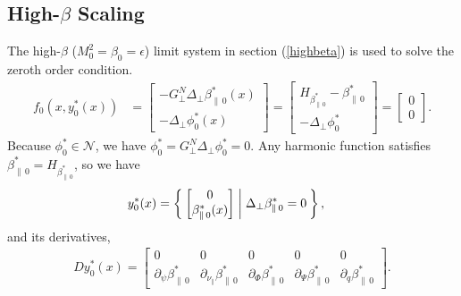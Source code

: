 \documentclass{article}
\newcommand{\para}{\parallel}
\newcommand{\ep}{\epsilon}
\newcommand{\lap}{\Delta_\perp}
\newcommand{\p}{\partial}
\newcommand{\GN}{G_\perp^N}
\newcommand{\bmat} [1] {\begin{bmatrix} #1 \end{bmatrix}}
\begin{document}
\subsection{High-$\beta$ Scaling}
The high-$\beta$ ($M_0^2 = \beta_0 = \ep$) limit system in section (\ref{highbeta}) is used to solve the zeroth order condition. 
\begin{align*}
    f_0(x,y_0^*(x)) &= \bmat{-\GN\lap\beta_{\para\,0}^*(x) \\ -\lap\phi_0^*(x)} = \bmat{H_{\beta_{\para\,0}^*} - \beta_{\para\,0}^* \\ -\lap\phi_0^*} = \bmat{0\\0}.   
\end{align*} 
Because $\phi_0^*\in\mathcal{N}$, we have $\phi_0^* = \GN\lap\phi_0^* = 0$. Any harmonic function satisfies $\beta_{\para\,0}^* = H_{\beta_{\para\,0}^*}$, so we have 
\begin{align} \label{y^*_0}
    y_0^*(x) &= \Set{\bmat{0 \\ \beta_{\para\,0}^*(x)} | \lap\beta_{\para\,0}^*=0},
\end{align}
and its derivatives,  
\begin{align*}
    Dy_0^*(x) = \bmat{0 & 0 & 0 & 0 & 0 \\
    \p_\psi \beta_{\para\,0}^* & \p_{\nu_\para} \beta_{\para\,0}^* & \p_\Phi \beta_{\para\,0}^* & \p_\Psi \beta_{\para\,0}^* & \p_q \beta_{\para\,0}^*}.
\end{align*}
\end{document}
